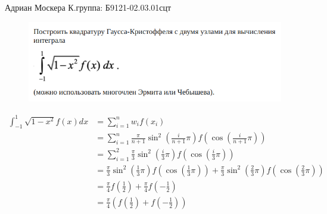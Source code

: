 \documentclass[varwidth=20cm,margin=1in,12pt]{standalone}
\begin{document}
Адриан Москера К.\hfill группа: Б9121-02.03.01сцт\\

\begin{figure}[t]
    \centering
    \includegraphics[width=18cm]{question.png}
\end{figure}

\begin{align*}
    \int_{-1}^{1} \sqrt{1-x^2}f(x)dx
     & = \sum_{i=1}^{n} w_i f(x_i)                                                          \\
     & = \sum_{i=1}^{n} \frac{\pi}{n+1} \sin^2\left(\frac{i}{n+1}\pi\right)
    f\left(\cos\left(\frac{i}{n+1}\pi\right)\right)                                         \\
     & = \sum_{i=1}^{2} \frac{\pi}{3} \sin^2\left(\frac{i}{3}\pi\right)
    f\left(\cos\left(\frac{i}{3}\pi\right)\right)                                           \\
     & = \frac{\pi}{3} \sin^2\left(\frac{1}{3}\pi\right)
    f\left(\cos\left(\frac{1}{3}\pi\right)\right) +
    \frac{\pi}{3} \sin^2\left(\frac{2}{3}\pi\right)
    f\left(\cos\left(\frac{2}{3}\pi\right)\right)                                           \\
     & = \frac{\pi}{4} f\left(\frac{1}{2}\right) + \frac{\pi}{4} f\left(-\frac{1}{2}\right) \\
     & = \frac{\pi}{4} \left(f\left(\frac{1}{2}\right) + f\left(-\frac{1}{2}\right)\right)  \\
\end{align*}
\end{document}

